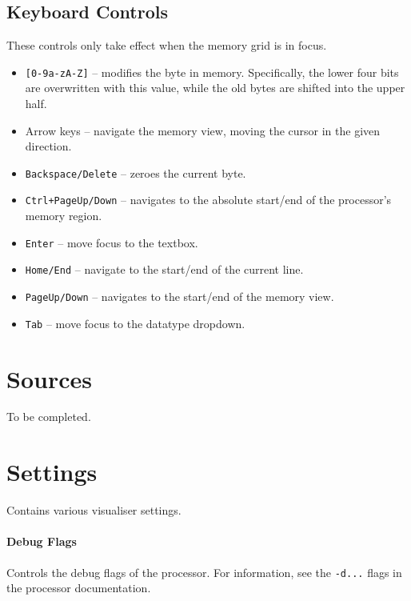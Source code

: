 \documentclass[10pt]{article}
\begin{document}
    \subsection{Keyboard Controls}

    These controls only take effect when the memory grid is in focus.

    \begin{itemize}
        \item \texttt{[0-9a-zA-Z]} -- modifies the byte in memory.
        Specifically, the lower four bits are overwritten with this value, while the old bytes are shifted into the upper half.
        \item Arrow keys -- navigate the memory view, moving the cursor in the given direction.
        \item \texttt{Backspace/Delete} -- zeroes the current byte.
        \item \texttt{Ctrl+PageUp/Down} -- navigates to the absolute start/end of the processor's memory region.
        \item \texttt{Enter} -- move focus to the textbox.
        \item \texttt{Home/End} -- navigate to the start/end of the current line.
        \item \texttt{PageUp/Down} -- navigates to the start/end of the memory view.
        \item \texttt{Tab} -- move focus to the datatype dropdown.
    \end{itemize}

    \section{Sources}

    To be completed.

    \section{Settings}

    Contains various visualiser settings.

    \paragraph*{Debug Flags}
    Controls the debug flags of the processor.
    For information, see the \texttt{-d...} flags in the processor documentation.
\end{document}
